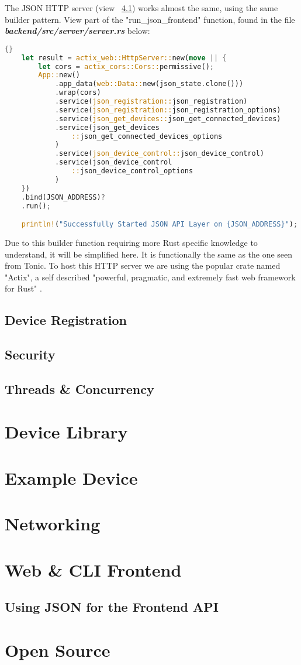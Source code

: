 The JSON HTTP server (view ~\ref{sec:chap3:frontend:json}) works almost the same, using the same builder pattern. View part of the "run\_json\_frontend" function, found in the file \textbf{\textit{backend/src/server/server.rs}} below:
\begin{lstlisting}[language=Rust, style=boxed, showstringspaces=false]{}
    let result = actix_web::HttpServer::new(move || {
        let cors = actix_cors::Cors::permissive();
        App::new()
            .app_data(web::Data::new(json_state.clone()))
            .wrap(cors)
            .service(json_registration::json_registration)
            .service(json_registration::json_registration_options)
            .service(json_get_devices::json_get_connected_devices)
            .service(json_get_devices
                ::json_get_connected_devices_options
            )
            .service(json_device_control::json_device_control)
            .service(json_device_control
                ::json_device_control_options
            )
    })
    .bind(JSON_ADDRESS)?
    .run();

    println!("Successfully Started JSON API Layer on {JSON_ADDRESS}");
\end{lstlisting}
Due to this builder function requiring more Rust specific knowledge to understand, it will be simplified here. It is functionally the same as the one seen from Tonic. To host this HTTP server we are using the popular crate named "Actix", a self described "powerful, pragmatic, and extremely fast web framework for Rust" \cite{actixWebsite}.
\subsection{Device Registration} \label{sec:chap3:server:registration} 


\subsection{Security} \label{sec:chap3:server:security}

\subsection{Threads \& Concurrency} \label{sec:chap3:server:threads}


\section{Device Library} \label{sec:chap3:devicelib}
\section{Example Device} \label{sec:chap3:deviceexample}
\section{Networking}

\section{Web \& CLI Frontend} \label{sec:chap3:frontend}
\subsection{Using JSON for the Frontend API} \label{sec:chap3:frontend:json}
\section{Open Source} \label{sec:chap3:opensource}
